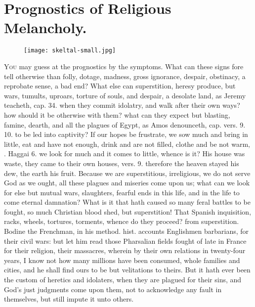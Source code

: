 {\section{Prognostics of Religious Melancholy.}
\begin{figure}[H]
  \begingroup
  \centering
  \texttt{[image: skeltal-small.jpg]}
  \label{fig:skeltal}
\end{figure}
\lettrine{Y}{ou} may guess at the prognostics by the symptoms. What can these signs
fore tell otherwise than folly, dotage, madness, gross ignorance,
despair, obstinacy, a reprobate sense, a bad end? What else can
superstition, heresy produce, but wars, tumults, uproars, torture of
souls, and despair, a desolate land, as Jeremy teacheth, cap.  34.
when they commit idolatry, and walk after their own ways? how should it
be otherwise with them? what can they expect but blasting, famine,
dearth, and all the plagues of Egypt, as Amos denounceth, cap. 
vers. 9. 10. to be led into captivity? If our hopes be frustrate, we
sow much and bring in little, eat and have not enough, drink and are
not filled, clothe and be not warm, \etc{}. Haggai  6. we look for much
and it comes to little, whence is it? His house was waste, they came to
their own houses, vers. 9. therefore the heaven stayed his dew, the
earth his fruit. Because we are superstitious, irreligious, we do not
serve God as we ought, all these plagues and miseries come upon us;
what can we look for else but mutual wars, slaughters, fearful ends in
this life, and in the life to come eternal damnation? What is it that
hath caused so many feral battles to be fought, so much Christian blood
shed, but superstition! That Spanish inquisition, racks, wheels,
tortures, torments, whence do they proceed? from superstition. Bodine
the Frenchman, in his \textlatin{method. hist.} accounts Englishmen
barbarians, for their civil wars: but let him read those Pharsalian
fields fought of late in France for their religion, their
massacres, wherein by their own relations in twenty-four years, I know
not how many millions have been consumed, whole families and cities,
and he shall find ours to be but velitations to theirs. But it hath
ever been the custom of heretics and idolaters, when they are plagued
for their sins, and God's just judgments come upon them, not to
acknowledge any fault in themselves, but still impute it unto others.

}
